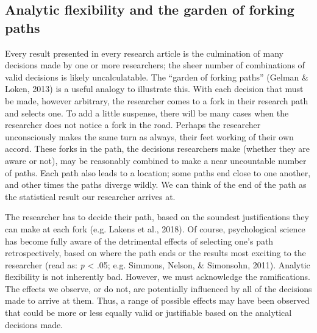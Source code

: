 \documentclass[
  english,
  man,floatsintext]{apa6}
\begin{document}
\hypertarget{analytic-flexibility-and-the-garden-of-forking-paths}{%
\subsection{Analytic flexibility and the garden of forking paths}\label{analytic-flexibility-and-the-garden-of-forking-paths}}

Every result presented in every research article is the culmination of many decisions made by one or more researchers; the sheer number of combinations of valid decisions is likely uncalculatable. The ``garden of forking paths'' (Gelman \& Loken, 2013) is a useful analogy to illustrate this. With each decision that must be made, however arbitrary, the researcher comes to a fork in their research path and selects one. To add a little suspense, there will be many cases when the researcher does not notice a fork in the road. Perhaps the researcher unconsciously makes the same turn as always, their feet working of their own accord. These forks in the path, the decisions researchers make (whether they are aware or not), may be reasonably combined to make a near uncountable number of paths. Each path also leads to a location; some paths end close to one another, and other times the paths diverge wildly. We can think of the end of the path as the statistical result our researcher arrives at.

The researcher has to decide their path, based on the soundest justifications they can make at each fork (e.g. Lakens et al., 2018). Of course, psychological science has become fully aware of the detrimental effects of selecting one's path retrospectively, based on where the path ends or the results most exciting to the researcher (read as: \emph{p} \textless{} .05; e.g. Simmons, Nelson, \& Simonsohn, 2011). Analytic flexibility is not inherently bad. However, we must acknowledge the ramifications. The effects we observe, or do not, are potentially influenced by all of the decisions made to arrive at them. Thus, a range of possible effects may have been observed that could be more or less equally valid or justifiable based on the analytical decisions made.
\end{document}

